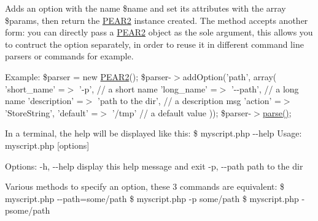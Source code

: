 \-Adds an option with the name \$name and set its attributes with the array \$params, then return the \hyperlink{namespace_p_e_a_r2}{\-P\-E\-A\-R2} instance created. \-The method accepts another form\-: you can directly pass a \hyperlink{namespace_p_e_a_r2}{\-P\-E\-A\-R2} object as the sole argument, this allows you to contruct the option separately, in order to reuse it in different command line parsers or commands for example.

\-Example\-: {\ttfamily  \$parser = new \hyperlink{namespace_p_e_a_r2}{\-P\-E\-A\-R2}(); \$parser-\/$>$add\-Option('path', array( 'short\-\_\-name' =$>$ '-\/p', // a short name 'long\-\_\-name' =$>$ '-\/-\/path', // a long name 'description' =$>$ 'path to the dir', // a description msg 'action' =$>$ '\-Store\-String', 'default' =$>$ '/tmp' // a default value )); \$parser-\/$>$\hyperlink{class_p_e_a_r2_1_1_console_1_1_command_line_abbb06a97b917ba9cef5341add43f8634}{parse()}; }

\-In a terminal, the help will be displayed like this\-: {\ttfamily  \$ myscript.\-php -\/-\/help \-Usage\-: myscript.\-php \mbox{[}options\mbox{]}}

{\ttfamily  \-Options\-: -\/h, -\/-\/help display this help message and exit -\/p, -\/-\/path path to the dir}

{\ttfamily  }

\-Various methods to specify an option, these 3 commands are equivalent\-: {\ttfamily  \$ myscript.\-php -\/-\/path=some/path \$ myscript.\-php -\/p some/path \$ myscript.\-php -\/psome/path }


